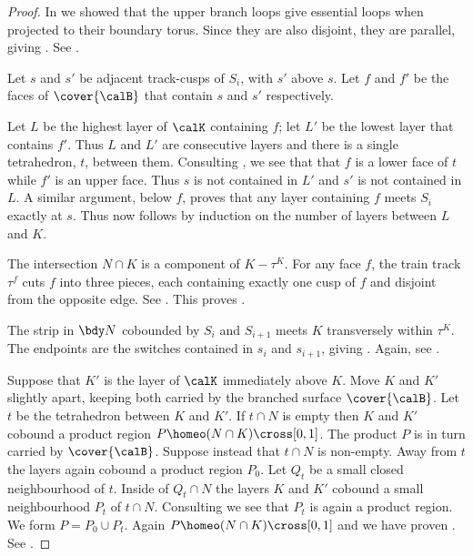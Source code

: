 \documentclass[12pt]{amsart}
\begin{document}
\begin{proof}
In  we showed that the upper branch loops give essential loops when projected to their boundary torus.  Since they are also disjoint, they are parallel, giving .  See .

Let $s$ and $s'$ be adjacent track-cusps of $S_i$, with $s'$ above $s$.  Let $f$ and $f'$ be the faces of $\cover{\calB}$ that contain $s$ and $s'$ respectively. 

Let $L$ be the highest layer of $\calK$ containing $f$; let $L'$ be the lowest layer that contains $f'$.  Thus $L$ and $L'$ are consecutive layers and there is a single tetrahedron, $t$, between them.  Consulting , we see that that $f$ is a lower face of $t$ while $f'$ is an upper face.  Thus $s$ is not contained in $L'$ and $s'$ is not contained in $L$.  A similar argument, below $f$, proves that any layer containing $f$ meets $S_i$ exactly at $s$.  Thus  now follows by induction on the number of layers between $L$ and $K$. 

The intersection $N \cap K$ is a component of $K - \tau^K$. For any face $f$, the train track $\tau^f$ cuts $f$ into three pieces, each containing exactly one cusp of $f$ and disjoint from the opposite edge. See .  This proves . 

The strip in $\bdy N$ cobounded by $S_i$ and $S_{i+1}$ meets $K$ transversely within $\tau^K$. The endpoints are the switches contained in $s_i$ and $s_{i+1}$, giving .  Again, see .

Suppose that $K'$ is the layer of $\calK$ immediately above $K$.  Move $K$ and $K'$ slightly apart, keeping both carried by the branched surface $\cover{\calB}$.  Let $t$ be the tetrahedron between $K$ and $K'$.  If $t \cap N$ is empty then $K$ and $K'$ cobound a product region $P \homeo (N \cap K) \cross [0,1]$.  The product $P$ is in turn carried by $\cover{\calB}$.  Suppose instead that $t \cap N$ is non-empty.  Away from $t$ the layers again cobound a product region $P_0$.  Let $Q_t$ be a small closed neighbourhood of $t$.  Inside of $Q_t \cap N$ the layers $K$ and $K'$ cobound a small neighbourhood $P_t$ of $t \cap N$.  Consulting  we see that $P_t$ is again a product region.  We form $P = P_0 \cup P_t$.  Again $P \homeo (N \cap K) \cross [0,1]$ and we have proven .  See .
\end{proof}
\end{document}
